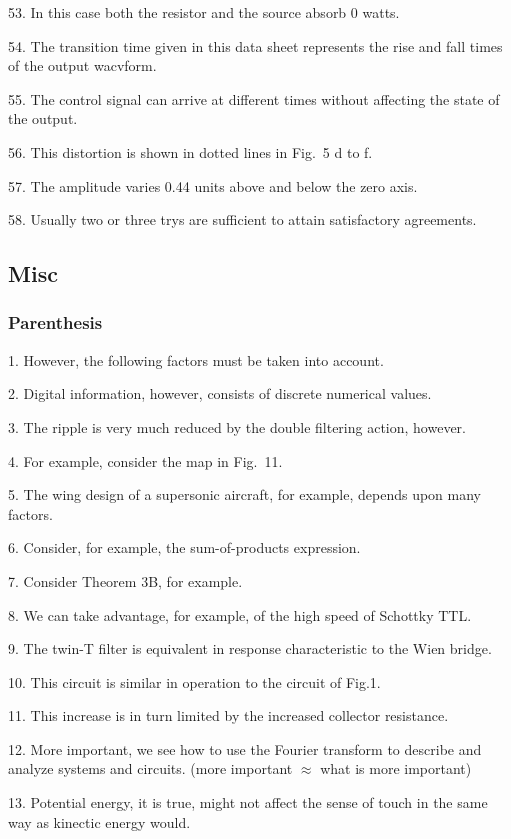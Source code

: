 \documentclass[a4paper,twocolumn,10pt]{article}
\begin{document}
\begin{CJK}{UTF8}{gkai}
	53. In this case both the resistor and the source absorb 0 watts.

	54. The transition time given in this data sheet represents the rise and fall
	times of the output wacvform.

	55. The control signal can arrive at different times without affecting the state of the output.

	56. This distortion is shown in dotted lines in Fig.~5 d to f.

	57. The amplitude varies 0.44 units above and below the zero axis.

	58. Usually two or three trys are sufficient to attain satisfactory agreements.

	\subsection{Misc}

	\subsubsection{Parenthesis}

	1. However, the following factors must be taken into account.

	2. Digital information, however, consists of discrete numerical values.

	3. The ripple is very much reduced by the double filtering action, however.

	4. For example, consider the map in Fig.~11.

	5. The wing design of a supersonic aircraft, for example, depends upon many factors.

	6. Consider, for example, the sum-of-products expression.

	7. Consider Theorem 3B, for example.

	8. We can take advantage, for example, of the high speed of Schottky TTL.

	9. The twin-T filter is equivalent in response characteristic to the Wien bridge.

	10. This circuit is similar in operation to the circuit of Fig.1.

	11. This increase is in turn limited by the increased collector resistance.

	12. More important, we see how to use the Fourier transform to describe and analyze systems
	and circuits. (more important $\approx$ what is more important)

	13. Potential energy, it is true, might not affect the sense of touch in the same way as kinectic
	energy would.


\end{CJK}
\end{document}
